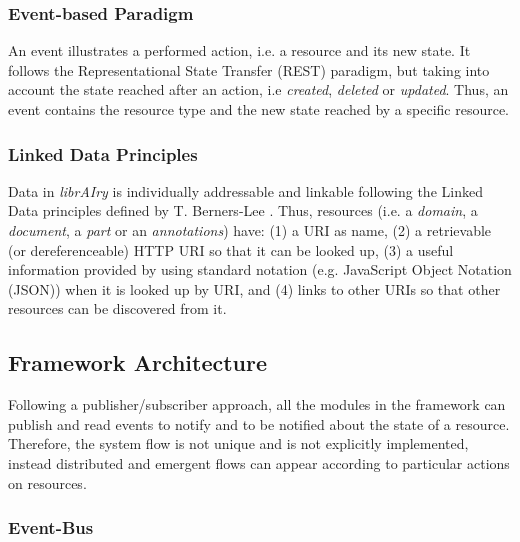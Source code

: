 \subsubsection{Event-based Paradigm}

An event illustrates a performed action, i.e. a resource and its new state. It follows the Representational State Transfer (REST)\cite{Fielding2002} paradigm, but taking into account the state reached after an action, i.e \textit{created}, \textit{deleted} or \textit{updated}. Thus, an event contains the resource type and the new state reached by a specific resource.


\subsubsection{Linked Data Principles }

Data in \textit{librAIry} is individually addressable and linkable \cite{Turchi2012a} following the Linked Data principles defined by T. Berners-Lee \cite{Bizer2009}. Thus, resources (i.e. a \textit{domain}, a \textit{document}, a \textit{part} or an \textit{annotations}) have:
(1) a URI as name, (2) a retrievable (or dereferenceable) HTTP URI so that it can be looked up, (3) a useful information provided by using standard notation (e.g. JavaScript Object Notation (JSON)) when it is  looked up by URI, and (4) links to other URIs so that other resources can be discovered from it.

\subsection{Framework Architecture}

Following a publisher/subscriber approach, all the modules in the framework can publish and read events to notify and to be notified about the state of a resource. 
Therefore, the system flow is not unique and is not explicitly implemented, instead distributed and emergent flows can appear according to particular actions on resources.

\subsubsection{Event-Bus}


